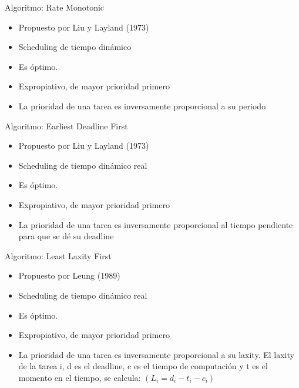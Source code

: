 \documentclass{beamer}
\begin{document}
\begin{frame}{Algoritmo: Rate Monotonic} 
\begin{itemize} 
   \item Propuesto por Liu y Layland (1973) 
   \item Scheduling de tiempo dinámico  
   \item Es óptimo. 
   \item Expropiativo, de mayor prioridad primero 
   \item La prioridad de una tarea es inversamente proporcional a su periodo 
\end{itemize} 
\end{frame} 
\begin{frame}{Algoritmo: Earliest Deadline First} 
\begin{itemize} 
   \item Propuesto por Liu y Layland (1973) 
   \item Scheduling de tiempo dinámico real 
   \item Es óptimo. 
   \item Expropiativo, de mayor prioridad primero 
   \item La prioridad de una tarea es inversamente proporcional al tiempo pendiente para que se dé su deadline 
\end{itemize} 
\end{frame} 
\begin{frame}{Algoritmo: Least Laxity First} 
\begin{itemize} 
   \item Propuesto por Leung (1989) 
   \item Scheduling de tiempo dinámico real 
   \item Es óptimo. 
   \item Expropiativo, de mayor prioridad primero 
   \item La prioridad de una tarea es inversamente proporcional a su laxity. El laxity de la tarea i, d es el deadline, c es el tiempo de computación y t es el momento en el tiempo, se calcula: $( L_{i} = d_{i} - t_{i} - c_{i} )$  
\end{itemize} 
\end{frame} 
\end{document}
